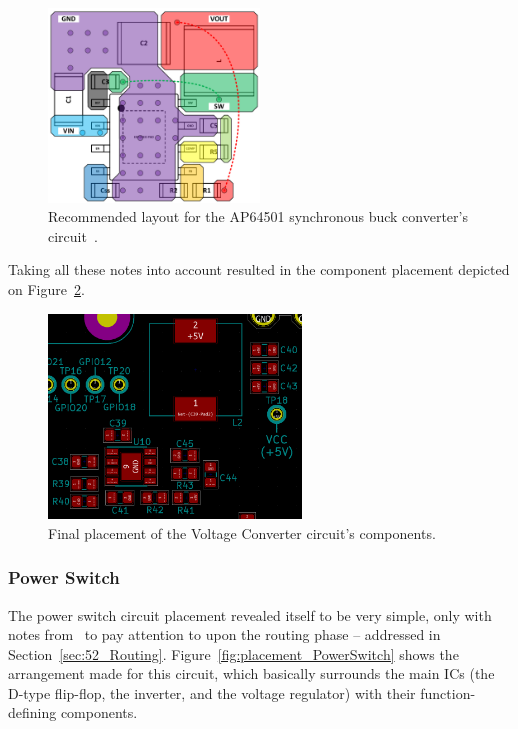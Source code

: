 \begin{figure}[h]
	\centering
	\includegraphics[width=0.5\textwidth]{Chapters/Figures/chapter5/AP64501_layout_Datasheet.pdf}
	\caption{Recommended layout for the AP64501 synchronous buck converter's circuit~\cite{AP64501}.}
	\label{fig:AP64501_layout_Datasheet}
\end{figure}

Taking all these notes into account resulted in the component placement depicted on Figure~\ref{fig:placement_VoltageConverter}.

\begin{figure}[h]
	\centering
	\includegraphics[width=0.6\textwidth]{Chapters/Figures/chapter5/placement_VoltageConverter.png}
	\caption{Final placement of the Voltage Converter circuit's components.}
	\label{fig:placement_VoltageConverter}
\end{figure}%


\subsubsection{Power Switch}\label{sec:5115_PowerSwitch}

The power switch circuit placement revealed itself to be very simple, only with notes from~\cite{SN74LVC2G74DCTR} to pay attention to upon the routing phase -- addressed in Section~\ref{sec:52_Routing}. Figure~\ref{fig:placement_PowerSwitch} shows the arrangement made for this circuit, which basically surrounds the main ICs (the D-type flip-flop, the inverter, and the voltage regulator) with their function-defining components.

